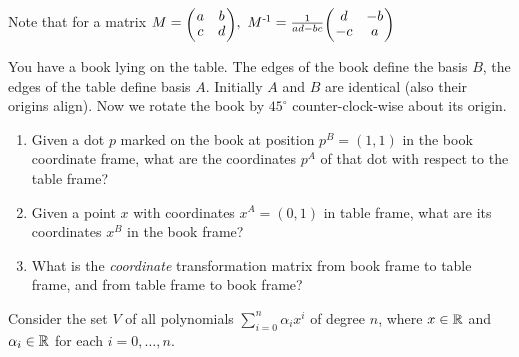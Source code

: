 Note that for a matrix $M = \mat{cc}{a & b \\ c & d},~ M^\1 = \frac{1}{ad-bc}\mat{cc}{d & -b \\ -c & a}$



You have a book lying on the table. The edges of the book define the basis
$B$, the edges of the table define basis $A$. Initially $A$ and $B$ are identical (also their origins align). Now we rotate the book
 by $45^\circ$ counter-clock-wise
about its origin.

\begin{enumerate}
\item Given a dot $p$ marked on the book at position
$p^B=(1,1)$ in the book coordinate frame, what are the coordinates
$p^A$ of that dot with respect to the table frame?

\item Given a point $x$ with coordinates $x^A=(0,1)$ in table
frame, what are its coordinates $x^B$ in the book frame?


\item What is the \emph{coordinate} transformation matrix from book frame to table frame, and from table frame to book
frame?

\end{enumerate}



Consider the set $V$ of all polynomials $\sum_{i=0}^n \alpha_i x^i$ of
degree $n$, where $x \in {\mathbb{R}}$ and $\alpha_i \in{\mathbb{R}}$ for each
$i=0,\ldots,n$.

